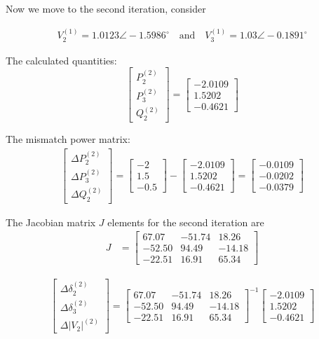 \documentclass[11pt, oneside, reqno]{amsart}
\numberwithin{equation}{section}
\theoremstyle{plain}%
\theoremstyle{definition}
\theoremstyle{remark}
\begin{document}
Now we move to the second iteration, consider


\begin{align}
	V^{(1)}_2=1.0123\angle -1.5986^{\circ} \quad\text{and}\quad V^{(1)}_3=1.03\angle -0.1891^{\circ}
\end{align}

The calculated quantities: 
\[\begin{bmatrix}
	P^{(2)}_2 \\
	P^{(2)}_3\\
	Q^{(2)}_2
\end{bmatrix} =
\begin{bmatrix}
	-2.0109\\
	1.5202\\
	-0.4621
\end{bmatrix}\]

The mismatch power matrix:
\begin{align*}
	\begin{bmatrix}
	\Delta P^{(2)}_2 \\
	\Delta P^{(2)}_3\\
	\Delta Q^{(2)}_2
\end{bmatrix} =
\begin{bmatrix}
	-2\\
	1.5\\
	-0.5
\end{bmatrix}
-
\begin{bmatrix}
	-2.0109\\
	1.5202\\
	-0.4621
\end{bmatrix}
=
\begin{bmatrix}
	-0.0109\\
	-0.0202\\
	-0.0379
\end{bmatrix}
\end{align*}

The Jacobian matrix $J$ elements for the second iteration are 
\begin{align*}
	J&=
	\begin{bmatrix}
	67.07 & -51.74 & 18.26\\
	-52.50 & 94.49 & -14.18\\
	-22.51 & 16.91 & 65.34	
	\end{bmatrix}
\end{align*}


\begin{align*}
		\begin{bmatrix}
		\Delta \delta^{(2)}_2\\
		\Delta \delta^{(2)}_3\\
		\Delta |V_2|^{(2)}
	\end{bmatrix}
	= 	\begin{bmatrix}
		67.07 & -51.74 & 18.26\\
	-52.50 & 94.49 & -14.18\\
	-22.51 & 16.91 & 65.34	
	\end{bmatrix}^{-1}
		\begin{bmatrix}
		-2.0109\\
		1.5202\\
		-0.4621
	\end{bmatrix}
\end{align*}
\end{document}
